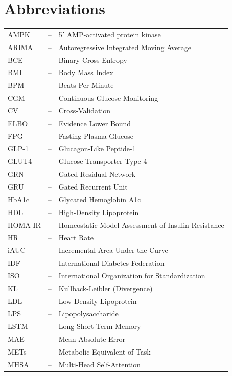 \documentclass[a4paper, 12pt]{report}
\theoremstyle{definition}
\begin{document}
	\section*{{\huge Abbreviations}\hfill} 
	\vspace{0.8cm}
	\begin{longtable}{lll}
	AMPK &--& 5$'$ AMP-activated protein kinase \\
    ARIMA &--& Autoregressive Integrated Moving Average \\
    BCE &--& Binary Cross-Entropy \\
    BMI &--& Body Mass Index \\
    BPM &--& Beats Per Minute \\
    CGM &--& Continuous Glucose Monitoring \\
    CV &--& Cross-Validation \\
    ELBO &--& Evidence Lower Bound \\
    FPG &--& Fasting Plasma Glucose \\
    GLP-1 &--& Glucagon-Like Peptide-1 \\
    GLUT4 &--& Glucose Transporter Type 4 \\
    GRN &--& Gated Residual Network \\
    GRU &--& Gated Recurrent Unit \\
    HbA1c &--& Glycated Hemoglobin A1c \\
    HDL &--& High-Density Lipoprotein \\
    HOMA-IR &--& Homeostatic Model Assessment of Insulin Resistance \\
    HR &--& Heart Rate \\
    iAUC &--& Incremental Area Under the Curve \\
    IDF &--& International Diabetes Federation \\
    ISO &--& International Organization for Standardization \\
    KL &--& Kullback-Leibler (Divergence) \\
    LDL &--& Low-Density Lipoprotein \\
    LPS &--& Lipopolysaccharide \\
    LSTM &--& Long Short-Term Memory \\
    MAE &--& Mean Absolute Error \\
    METs &--& Metabolic Equivalent of Task \\
    MHSA &--& Multi-Head Self-Attention \\

\end{longtable}
\end{document}
